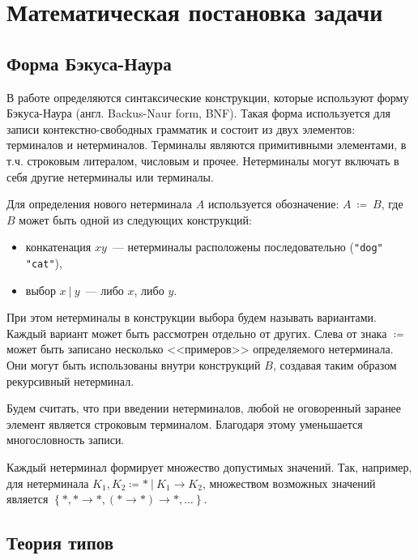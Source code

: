\chapter{Математическая постановка задачи}
\label{ch:math}



\section{Форма Бэкуса-Наура}
\label{sec:bnf}


В работе определяются синтаксические конструкции, которые используют форму Бэкуса-Наура (англ. Backus-Naur form, BNF).
Такая форма используется для записи контекстно-свободных грамматик и состоит из двух элементов: терминалов и нетерминалов.
Терминалы являются примитивными элементами, в т.ч. строковым литералом, числовым и прочее.
Нетерминалы могут включать в себя другие нетерминалы или терминалы.

Для определения нового нетерминала $A$ используется обозначение: $A~\coloneqq~B$, где $B$ может быть одной из следующих конструкций:
\begin{itemize}
    \item конкатенация $x y$~--- нетерминалы расположены последовательно (\lstinline{"dog"  "cat"}),
    \item выбор $x ~|~ y$~--- либо $x$, либо $y$.
\end{itemize}
При этом нетерминалы в конструкции выбора будем называть вариантами.
Каждый вариант может быть рассмотрен отдельно от других.
Слева от знака $\coloneqq$ может быть записано несколько <<примеров>> определяемого нетерминала.
Они могут быть использованы внутри конструкций $B$, создавая таким образом рекурсивный нетерминал.

Будем считать, что при введении нетерминалов, любой не оговоренный заранее элемент является строковым терминалом.
Благодаря этому уменьшается многословность записи.

Каждый нетерминал формирует множество допустимых значений.
Так, например, для нетерминала $K_1, K_2 \coloneqq * ~|~ K_1 \to K_2$, множеством возможных значений является $\left\{ *, * \to *, (* \to *) \to *, \ldots \right\}$.


\section{Теория типов}
\label{sec:type_theory}

